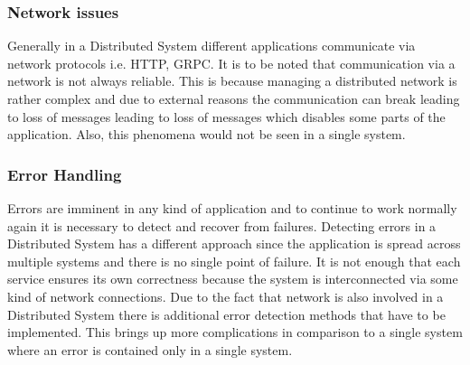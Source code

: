         \subsubsection{Network issues}
        Generally in a Distributed System different applications communicate via network protocols i.e. HTTP, GRPC. It is to be noted that
        communication via a network is not always reliable. This is because managing a distributed network is rather complex and due to
        external reasons the communication can break leading to loss of messages leading to loss of messages which disables some parts of the application. 
        Also, this phenomena would not be seen in a single system.

        \subsubsection{Error Handling}
        Errors are imminent in any kind of application and to continue to work normally again it is necessary to detect and recover from failures.
        Detecting errors in a Distributed System has a different approach since the application is spread across multiple systems and there is no 
        single point of failure. It is not enough that each service ensures its own correctness because the system is interconnected via some kind of
        network connections. Due to the fact that network is also involved in a Distributed System there is additional error detection methods that have
        to be implemented. This brings up more complications in comparison to a single system where an error is contained only in a single system.

         
